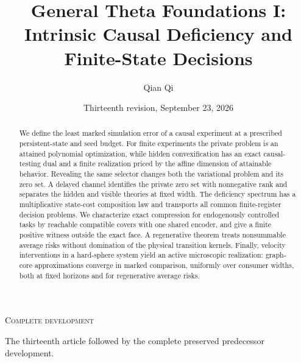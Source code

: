 
\newcommand{\Wone}{W_1}
\newcommand{\Del}{\Delta}
\newcommand{\emptyw}{\varnothing}
\newcommand{\osc}{\operatorname{osc}}
\newcommand{\diam}{\operatorname{diam}}
\newcommand{\Lipone}{\operatorname{Lip}_1}
\newcommand{\aff}{\operatorname{aff}}
\newcommand{\conv}{\operatorname{conv}}
\newcommand{\rplus}{\operatorname{rank}_{+}}
\newcommand{\dpr}{\delta^{\rm p}}
\newcommand{\dhi}{\delta^{\rm h}}
\newcommand{\dvi}{\delta^{\rm v}}
\newcommand{\dmix}{\delta^{\rm mix}}
\newcommand{\cK}{\mathcal K}
\newcommand{\cB}{\mathcal B}
\newcommand{\cI}{\mathcal I}
\title[General Theta Foundations I]{General Theta Foundations I:\\Intrinsic Causal Deficiency and Finite-State Decisions}
\author{Qian Qi}
\date{Thirteenth revision, September 23, 2026}

\begin{abstract}
We define the least marked simulation error of a causal experiment at a
prescribed persistent-state and seed budget. For finite experiments the
private problem is an attained polynomial optimization, while hidden
convexification has an exact causal-testing dual and a finite realization
priced by the affine dimension of attainable behavior. Revealing the same
selector changes both the variational problem and its zero set. A delayed
channel identifies the private zero set with nonnegative rank and separates
the hidden and visible theories at fixed width. The deficiency spectrum
has a multiplicative state-cost composition law and transports all common
finite-register decision problems. We characterize exact compression for
endogenously controlled tasks by reachable compatible covers with one
shared encoder, and give a finite positive witness outside the exact face.
A regenerative theorem treats nonsummable average risks without domination
of the physical transition kernels. Finally, velocity interventions in a
hard-sphere system yield an active microscopic realization: graph-core
approximations converge in marked comparison, uniformly over consumer
widths, both at fixed horizons and for regenerative average risks.
\end{abstract}
\maketitle
\ifcomplete
\begin{center}\small\textsc{Complete development}\par
The thirteenth article followed by the complete preserved predecessor development.
\end{center}
\fi
\tableofcontents
